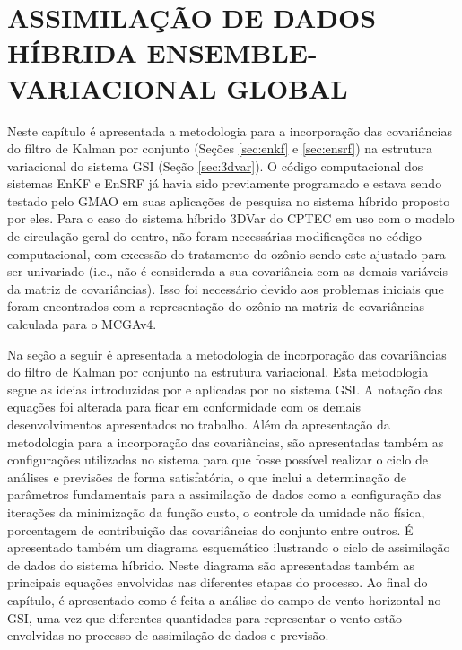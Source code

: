 \chapter{ASSIMILAÇÃO DE DADOS HÍBRIDA ENSEMBLE-VARIACIONAL GLOBAL}
\label{cap:incorpora_covars}

Neste capítulo é apresentada a metodologia para a incorporação das covariâncias do filtro de Kalman por conjunto (Seções \ref{sec:enkf} e \ref{sec:ensrf}) na estrutura variacional do sistema GSI (Seção \ref{sec:3dvar}). O código computacional dos sistemas EnKF e EnSRF já havia sido previamente programado e estava sendo testado pelo GMAO em suas aplicações de pesquisa no sistema híbrido proposto por eles. Para o caso do sistema híbrido 3DVar do CPTEC em uso com o modelo de circulação geral do centro, não foram necessárias modificações no código computacional, com excessão do tratamento do ozônio sendo este ajustado para ser univariado (i.e., não é considerada a sua covariância com as demais variáveis da matriz de covariâncias). Isso foi necessário devido aos problemas iniciais que foram encontrados com a representação do ozônio na matriz de covariâncias calculada para o MCGAv4.

Na seção a seguir é apresentada a metodologia de incorporação das covariâncias do filtro de Kalman por conjunto na estrutura variacional. Esta metodologia segue as ideias introduzidas por  e aplicadas por  no sistema GSI. A notação das equações foi alterada para ficar em conformidade com os demais desenvolvimentos apresentados no trabalho. Além da apresentação da metodologia para a incorporação das covariâncias, são apresentadas também as configurações utilizadas no sistema para que fosse possível realizar o ciclo de análises e previsões de forma satisfatória, o que inclui a determinação de parâmetros fundamentais para a assimilação de dados como a configuração das iterações da minimização da função custo, o controle da umidade não física, porcentagem de contribuição das covariâncias do conjunto entre outros. É apresentado também um diagrama esquemático ilustrando o ciclo de assimilação de dados do sistema híbrido. Neste diagrama são apresentadas também as principais equações envolvidas nas diferentes etapas do processo. Ao final do capítulo, é apresentado como é feita a análise do campo de vento horizontal no GSI, uma vez que diferentes quantidades para representar o vento estão envolvidas no processo de assimilação de dados e previsão.

